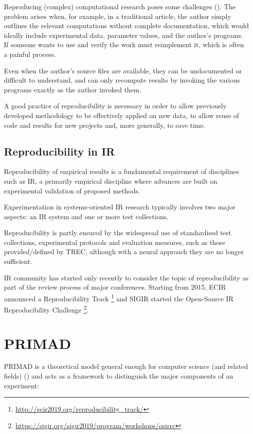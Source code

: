 Reproducing (complex) computational research poses some challenges (\cite{comprepro}). The problem arises when, for example, in a traditional article, the author simply outlines the relevant computations without complete documentation, which would ideally include experimental data, parameter values, and the author's programs.
If someone wants to use and verify the work must reimplement it, which is often a painful process.

Even when the author's source files are available, they can be undocumented or difficult to understand, and can only recompute results by invoking the various programs exactly as the author invoked them.

A good practice of reproducibility is necessary in order to allow previously developed methodology to be effectively applied on new data, to allow reuse of code and results for new projects and, more generally, to save time.

\subsection{Reproducibility in IR}

Reproducibility of empirical results is a fundamental requirement of disciplines such as IR, a primarily empirical discipline where advances are built on experimental validation of proposed methods.

Experimentation in systems-oriented IR research typically involves two major aspects: an IR system and one or more test collections.

Reproducibility is partly ensured by the widespread use of standardised test collections, experimental protocols and evaluation measures, such as those provided/defined by TREC, although with a neural approach they are no longer sufficient.

IR community has started only recently to consider the topic of reproducibility as part of the review process of major conferences. Starting from 2015, ECIR announced a Reproducibility Track \footnote{\url{http://ecir2019.org/reproducibility_track/}} and SIGIR started the Open-Source IR Reproducibility Challenge \footnote{\url{https://sigir.org/sigir2019/program/workshops/osirrc}}.

\section{PRIMAD}

PRIMAD is a theoretical model general enough for computer science (and related fields) (\cite{primad}) and acts as a framework to distinguish the major components of an experiment:

